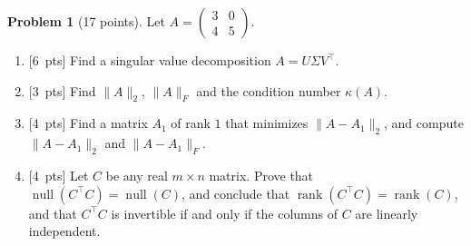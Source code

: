 \documentclass[11pt]{article}
\theoremstyle{definition}
\newtheorem{problem}{Problem}
\newcommand{\norm}[1]{\lVert #1 \rVert}
\newcommand{\pts}[1]{\textup{[#1~pts]}}
\DeclareMathOperator{\rank}{rank}
\DeclareMathOperator{\Null}{null}
\begin{document}
\begin{problem}[17 points]\label{pr:mid-svd}
    Let $A = \begin{pmatrix} 3 & 0 \\ 4 & 5 \end{pmatrix}$.
    \begin{enumerate}[label=(\alph*)]
        \item \pts{6} Find a singular value decomposition $A = U\Sigma V^\top$.
        \item \pts{3} Find $\norm{A}_2$, $\norm{A}_F$ and the condition number $\kappa(A)$.
        \item \pts{4} Find a matrix $A_1$ of rank $1$ that minimizes $\norm{A - A_1}_2$, and compute $\norm{A - A_1}_2$ and $\norm{A - A_1}_F$.
        \item \pts{4} Let $C$ be any real $m \times n$ matrix. Prove that $\Null(C^\top C) = \Null(C)$, and conclude that $\rank(C^\top C) = \rank(C)$, and that $C^\top C$ is invertible if and only if the columns of $C$ are linearly independent.
    \end{enumerate}
\end{problem}
\end{document}
